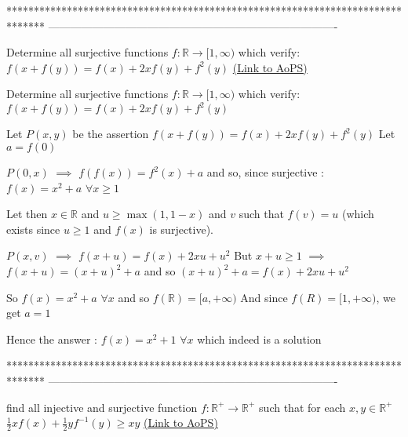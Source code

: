 *******************************************************************************
-------------------------------------------------------------------------------

\begin{problem}
	Determine all surjective functions $f:\mathbb{R}\to[1,\infty)$ which verify:
$f(x+f(y))=f(x)+2xf(y)+f^2(y)$
	\flushright \href{https://artofproblemsolving.com/community/c6h468004}{(Link to AoPS)}
\end{problem}



\begin{solution}
	\begin{tcolorbox}Determine all surjective functions $f:\mathbb{R}\to[1,\infty)$ which verify:
$f(x+f(y))=f(x)+2xf(y)+f^2(y)$\end{tcolorbox}
Let $P(x,y)$ be the assertion $f(x+f(y))=f(x)+2xf(y)+f^2(y)$
Let $a=f(0)$

$P(0,x)$ $\implies$ $f(f(x))=f^2(x)+a$ and so, since surjective : $f(x)=x^2+a$ $\forall x\ge 1$

Let then $x\in\mathbb R$ and $u\ge\max(1,1-x)$ and $v$ such that $f(v)=u$ (which exists since $u\ge 1$ and $f(x)$ is surjective).

$P(x,v)$ $\implies$ $f(x+u)=f(x)+2xu+u^2$
But $x+u\ge 1$ $\implies$ $f(x+u)=(x+u)^2+a$ and so $(x+u)^2+a=f(x)+2xu+u^2$

So $f(x)=x^2+a$ $\forall x$ and so $f(\mathbb R)=[a,+\infty)$
And since $f(R)=[1,+\infty)$, we get $a=1$

Hence the answer : $\boxed{f(x)=x^2+1}$ $\forall x$ which indeed is a solution
\end{solution}
*******************************************************************************
-------------------------------------------------------------------------------

\begin{problem}
	find all injective and surjective function $ f:\mathbb{R}^{+}\rightarrow\mathbb{R}^{+} $ such that for each $ x,y\in\mathbb{R}^{+} $ 
                                          $\frac{1}{2}xf(x)+\frac{1}{2}yf^{-1}(y)\geq xy$
	\flushright \href{https://artofproblemsolving.com/community/c6h468410}{(Link to AoPS)}
\end{problem}



